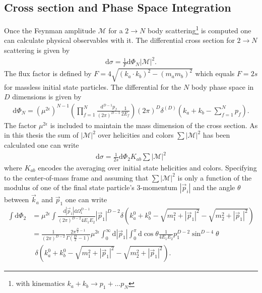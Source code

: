 \subsection{Cross section and Phase Space Integration}\label{sec:cross_section}
Once the Feynman amplitude $\mathcal{M}$ for a $2 \to N$ body scattering\footnote{with kinematics $k_a + k_b \to p_1 + \hdots p_N$} is computed one can calculate physical observables with it. The differential cross section for $2 \to N$ scattering is given by
\begin{align}
\mbox{d}\sigma = \frac{1}{F}\mathrm{d}\Phi_N |\mathcal{M}|^2.
\end{align}
The flux factor is defined by $F = 4\sqrt{(k_a\cdot k_b)^2 - (m_am_b)^2}$ which equals $F = 2s$ for massless initial state particles. The differential for the $N$ body phase space in $D$ dimensions is given by
\begin{align}
\mathrm{d}\Phi_N = \left( \mu^{2\epsilon} \right)^{N-1} \left( \prod_{f=1}^N \frac{\mbox{d}^{D-1}p_f}{(2\pi)^{D-1}}\frac{1}{2E_f} \right)  (2\pi)^D \delta^{(D)}(k_a+k_b-\sum_{f=1}^N p_f).
\end{align} 
The factor $\mu^{2\epsilon}$ is included to maintain the mass dimension of the cross section. As in this thesis the sum of $|\mathcal{M}|^2$ over helicities and colors $\sum |\mathcal{M}|^2$ has been calculated one can write
\begin{align}
\mathrm{d}\sigma = \frac{1}{2s} \mathrm{d}\Phi_2 K_{ab} \sum |\mathcal{M}|^2
\end{align} 
where $K_{ab}$ encodes the averaging over initial state helicities and colors. Specifying to the center-of-mass frame and assuming that $\sum|\mathcal{M}|^2$ is only a function of the modulus of one of the final state particle's 3-momentum $ |\vec{p}_i|$ and the angle $\theta$ between $\vec{k}_a$ and $\vec{p}_1$ one can write
\begin{align}
\int \mathrm{d}\Phi_2 &= \mu^{2\epsilon} \int \frac{\mathrm{d}|\vec{p}_1|\mathrm{d}\Omega^{D-1}_1}{(2\pi)^{D-2} 4 E_1 E_2} |\vec{p}_1|^{D-2} \delta \left(k_a^0 + k_b^0 - \sqrt{m_1^2 + |\vec{p}_1|^2} - \sqrt{m_2^2 + |\vec{p}_1|^2} \right)\nonumber\\
&= \frac{1}{(2\pi)^{D-2}}\frac{2\pi^{\frac{D}{2}-1}}{\Gamma(\frac{D}{2}-1)} \mu^{2\epsilon} \int_0^\infty\mathrm{d}|\vec{p}_1| \int_0^\pi \mathrm{d} \cos\theta \frac{1}{4 E_1 E_2} p_1^{D-2}\sin^{D-4}\theta\nonumber\\
&\ \ \delta \left(k_a^0 + k_b^0 - \sqrt{m_1^2 + |\vec{p}_1|^2} - \sqrt{m_2^2 + |\vec{p}_1|^2} \right).\label{eq:DPhi2}
\end{align}
